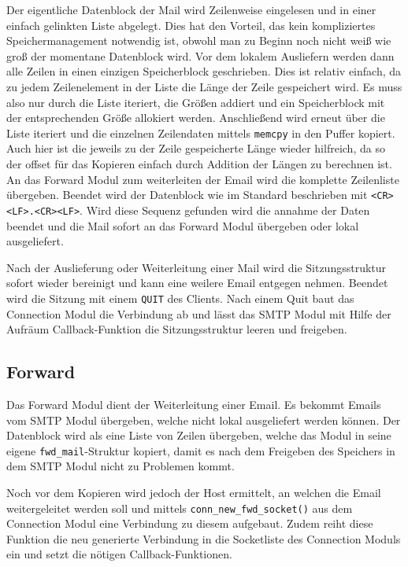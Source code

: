 \documentclass[final,a4paper,11pt,notitlepage,halfparskip]{scrreprt}
\begin{document}
Der eigentliche Datenblock der Mail wird Zeilenweise eingelesen und in einer
einfach gelinkten Liste abgelegt. Dies hat den Vorteil, das kein kompliziertes
Speichermanagement notwendig ist, obwohl man zu Beginn noch nicht weiß wie groß
der momentane Datenblock wird. Vor dem lokalem Ausliefern werden dann alle 
Zeilen in einen einzigen Speicherblock geschrieben. Dies ist relativ einfach, 
da zu jedem Zeilenelement in der Liste die Länge der Zeile gespeichert wird. 
Es muss also nur durch die Liste iteriert, die Größen addiert und ein 
Speicherblock mit der entsprechenden Größe allokiert werden. 
Anschließend wird erneut über die Liste iteriert und die einzelnen Zeilendaten 
mittels \texttt{memcpy} in den Puffer kopiert. Auch hier ist die jeweils zu der 
Zeile gespeicherte Länge wieder hilfreich, da so der offset für das Kopieren 
einfach durch Addition der Längen zu berechnen ist. 
An das Forward Modul zum weiterleiten der Email wird die komplette Zeilenliste
übergeben.
Beendet wird der Datenblock wie im Standard beschrieben mit
\texttt{<CR><LF>.<CR><LF>}. Wird diese Sequenz gefunden wird die annahme der
Daten beendet und die Mail sofort an das Forward Modul übergeben oder lokal
ausgeliefert.

Nach der Auslieferung oder Weiterleitung einer Mail wird die Sitzungsstruktur
sofort wieder bereinigt und kann eine weilere Email entgegen nehmen. Beendet
wird die Sitzung mit einem \texttt{QUIT} des Clients. Nach einem Quit baut das
Connection Modul die Verbindung ab und lässt das SMTP Modul mit Hilfe der 
Aufräum Callback-Funktion die Sitzungsstruktur leeren und freigeben.


\subsection{Forward}
Das Forward Modul dient der Weiterleitung einer Email. Es bekommt Emails vom
SMTP Modul übergeben, welche nicht lokal ausgeliefert werden können. Der
Datenblock wird als eine Liste von Zeilen übergeben, welche das Modul in seine
eigene \texttt{fwd\_mail}-Struktur kopiert, damit es nach dem Freigeben des
Speichers in dem SMTP Modul nicht zu Problemen kommt.

Noch vor dem Kopieren wird jedoch der Host ermittelt, an welchen die Email
weitergeleitet werden soll und mittels \texttt{conn\_new\_fwd\_socket()} aus dem
Connection Modul eine Verbindung zu diesem aufgebaut. Zudem reiht diese Funktion
die neu generierte Verbindung in die Socketliste des Connection Moduls ein und
setzt die nötigen Callback-Funktionen.
\end{document}
